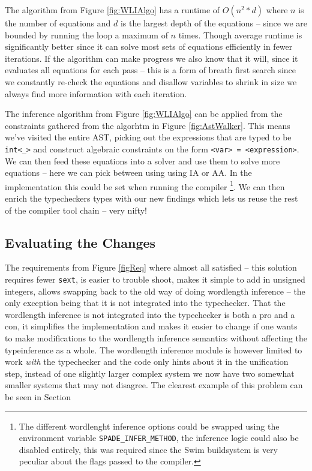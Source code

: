The algorithm from Figure \ref{fig:WLIAlgo} has a runtime of $O(n^2*d)$ where $n$ is the number of equations and $d$ is the largest depth of the equations -- since we are bounded by running the loop a maximum of $n$ times. Though average runtime is significantly better since it can solve most sets of equations efficiently in fewer iterations. If the algorithm can make progress we also know that it will, since it evaluates all equations for each pass -- this is a form of breath first search since we constantly re-check the equations and disallow variables to shrink in size we always find more information with each iteration.

The inference algorithm from Figure \ref{fig:WLIAlgo} can be applied from the constraints gathered from the algorhtm in Figure \ref{fig:AstWalker}. This means we've visited the entire AST, picking out the expressions that are typed to be \verb+int<_>+ and construct algebraic constraints on the form \verb+<var> = <expression>+. We can then feed these equations into a solver and use them to solve more equations -- here we can pick between using using IA or AA. In the implementation this could be set when running the compiler \cprotect\footnote{The different wordlenght inference options could be swapped using the environment variable \verb+SPADE_INFER_METHOD+, the inference logic could also be disabled entirely, this was required since the Swim buildsystem is very peculiar about the flags passed to the compiler.}. We can then enrich the typecheckers types with our new findings which lets us reuse the rest of the compiler tool chain -- very nifty!

\subsection{Evaluating the Changes}
The requirements from Figure \ref{figReq} where almost all satisfied -- this solution requires fewer \verb+sext+, is easier to trouble shoot, makes it simple to add in unsigned integers, allows swapping back to the old way of doing wordlength inference -- the only exception being that it is not integrated into the typechecker. That the wordlength inference is not integrated into the typechecker is both a pro and a con, it simplifies the implementation and makes it easier to change if one wants to make modifications to the wordlength inference semantics without affecting the typeinference as a whole. The wordlength inference module is however limited to work \textit{with} the typechecker and the code only hints about it in the unification step, instead of one slightly larger complex system we now have two somewhat smaller systems that may not disagree. The clearest example of this problem can be seen in Section \

